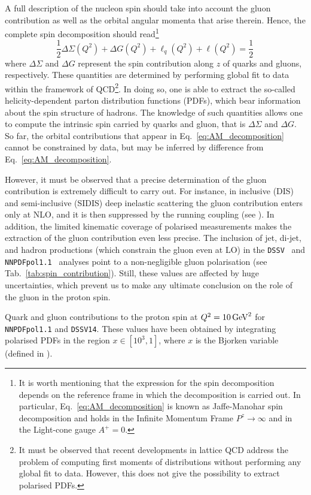 A full description of the nucleon spin should take into account the gluon contribution as well as the orbital angular momenta that arise therein. Hence, the complete spin decomposition should read\footnote{\footnotesize It is worth mentioning that the expression for the spin decomposition depends on the reference frame in which the decomposition is carried out. In particular, Eq.~\eqref{eq:AM_decomposition} is known as Jaffe-Manohar spin decomposition and holds in the Infinite Momentum Frame $P^z \rightarrow \infty$ and in the Light-cone gauge $A^+=0$.}
%
\begin{equation}
  \frac{1}{2} \Delta \Sigma(Q^2) + \Delta G(Q^2) + \ell_{q}(Q^2) + \ell(Q^2) = \frac{1}{2} \,
  \label{eq:AM_decomposition}
\end{equation}
%
where $\Delta \Sigma$ and $\Delta G$ represent the spin contribution along $z$ of quarks and gluons, respectively. These quantities are determined by performing global fit to data within the framework of QCD\footnote{\footnotesize It must be observed that recent developments in lattice QCD address the problem of computing first moments of distributions without performing any global fit to data. However, this does not give the possibility to extract polarised PDFs.}. In doing so, one is able to extract the so-called helicity-dependent parton distribution functions (PDFs), which bear information about the spin structure of hadrons. The knowledge of such quantities allows one to compute the intrinsic spin carried by quarks and gluon, that is $\Delta \Sigma$ and $\Delta G$. So far, the orbital contributions that appear in Eq.~\eqref{eq:AM_decomposition} cannot be constrained by data, but may be inferred by difference from Eq.~\eqref{eq:AM_decomposition}.%

However, it must be observed that a precise determination of the gluon contribution is extremely difficult to carry out. For instance, in inclusive (DIS) and semi-inclusive (SIDIS) deep inelastic scattering the gluon contribution enters only at NLO, and it is then suppressed by the running coupling (see ). In addition, the limited kinematic coverage of polarised measurements makes the extraction of the gluon contribution even less precise. The inclusion of jet, di-jet, and hadron productions (which constrain the gluon even at LO) in the \texttt{DSSV}~\cite{DeFlorian:2019xxt} and \texttt{NNPDFpol1.1}~\cite{Nocera:2014gqa} analyses point to a non-negligible gluon polarisation (see Tab.~\ref{tab:spin_contribution}). Still, these values are affected by huge uncertainties, which prevent us to make any ultimate conclusion on the role of the gluon in the proton spin.
\begin{table}[t]
  \centering 
  \small
  
  \caption{
    \small
    Quark and gluon contributions to the proton spin at $Q^2 = 10 \, \textrm{GeV}^2$ for \texttt{NNPDFpol1.1} and \texttt{DSSV14}. These values have been obtained by integrating polarised PDFs in the region $x \in [10^3,1]$, where $x$ is the Bjorken variable (defined in ).
  \label{tab:spin_contribution}}
\end{table}

